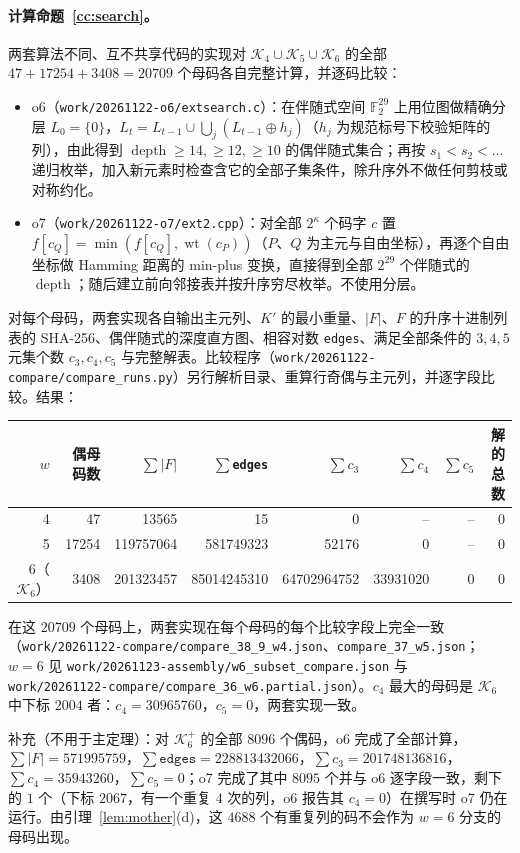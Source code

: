 \documentclass[11pt]{ctexart}
\theoremstyle{definition}
\newcommand{\F}{\mathbb{F}_2}
\newcommand{\wt}{\operatorname{wt}}
\newcommand{\depth}{\operatorname{depth}}
\begin{document}
\paragraph{计算命题~\ref{cc:search}。}两套算法不同、互不共享代码的实现对 $\mathcal K_4\cup\mathcal K_5\cup\mathcal K_6$ 的全部 $47+17254+3408=20709$ 个母码各自完整计算，并逐码比较：
\begin{itemize}
\item o6（\texttt{work/20261122-o6/extsearch.c}）：在伴随式空间 $\F^{29}$ 上用位图做精确分层 $L_0=\{0\}$，$L_t=L_{t-1}\cup\bigcup_j(L_{t-1}\oplus h_j)$（$h_j$ 为规范标号下校验矩阵的列），由此得到 $\depth\ge14,\ge12,\ge10$ 的偶伴随式集合；再按 $s_1<s_2<\dots$ 递归枚举，加入新元素时检查含它的全部子集条件，除升序外不做任何剪枝或对称约化。
\item o7（\texttt{work/20261122-o7/ext2.cpp}）：对全部 $2^\kappa$ 个码字 $c$ 置 $f[c_Q]=\min(f[c_Q],\wt(c_P))$（$P$、$Q$ 为主元与自由坐标），再逐个自由坐标做 Hamming 距离的 min-plus 变换，直接得到全部 $2^{29}$ 个伴随式的 $\depth$；随后建立前向邻接表并按升序穷尽枚举。不使用分层。
\end{itemize}
对每个母码，两套实现各自输出主元列、$K'$ 的最小重量、$|F|$、$F$ 的升序十进制列表的 SHA-256、偶伴随式的深度直方图、相容对数 \texttt{edges}、满足全部条件的 $3,4,5$ 元集个数 $c_3,c_4,c_5$ 与完整解表。比较程序（\texttt{work/20261122-compare/compare\_runs.py}）另行解析目录、重算行奇偶与主元列，并逐字段比较。结果：
\begin{center}
\begin{tabular}{rrrrrrrr}
\toprule
$w$ & 偶母码数 & $\sum|F|$ & $\sum$\texttt{edges} & $\sum c_3$ & $\sum c_4$ & $\sum c_5$ & 解的总数\\
\midrule
4 & 47 & 13565 & 15 & 0 & -- & -- & 0\\
5 & 17254 & 119757064 & 581749323 & 52176 & 0 & -- & 0\\
6（$\mathcal K_6$）& 3408 & 201323457 & 85014245310 & 64702964752 & 33931020 & 0 & 0\\
\bottomrule
\end{tabular}
\end{center}
在这 $20709$ 个母码上，两套实现在每个母码的每个比较字段上完全一致（\texttt{work/20261122-compare/compare\_38\_9\_w4.json}、\texttt{compare\_37\_w5.json}；$w=6$ 见 \texttt{work/20261123-assembly/w6\_subset\_compare.json} 与 \texttt{work/20261122-compare/compare\_36\_w6.partial.json}）。$c_4$ 最大的母码是 $\mathcal K_6$ 中下标 $2004$ 者：$c_4=30965760$，$c_5=0$，两套实现一致。

补充（不用于主定理）：对 $\mathcal K_6^{+}$ 的全部 $8096$ 个偶码，o6 完成了全部计算，$\sum|F|=571995759$，$\sum\texttt{edges}=228813432066$，$\sum c_3=201748136816$，$\sum c_4=35943260$，$\sum c_5=0$；o7 完成了其中 $8095$ 个并与 o6 逐字段一致，剩下的 $1$ 个（下标 $2067$，有一个重复 $4$ 次的列，o6 报告其 $c_4=0$）在撰写时 o7 仍在运行。由引理~\ref{lem:mother}(d)，这 $4688$ 个有重复列的码不会作为 $w=6$ 分支的母码出现。
\end{document}

